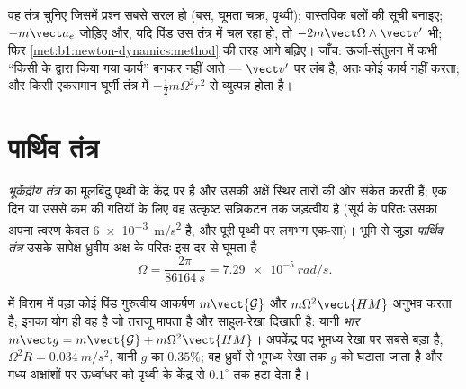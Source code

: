 \begin{method}\label{met:b1:non-inertial-frames:method}
वह तंत्र चुनिए जिसमें प्रश्न सबसे सरल हो (बस, घूमता चक्र, पृथ्वी);
वास्तविक बलों की सूची बनाइए; $-m\vect a_e$ जोड़िए और, यदि पिंड उस तंत्र में
चल रहा हो, तो $-2m\vect\Omega\wedge\vect v'$ भी; फिर
\cref{met:b1:newton-dynamics:method} की तरह आगे बढ़िए। जाँच: 
ऊर्जा-संतुलन में कभी ``किसी के द्वारा किया गया कार्य'' बनकर नहीं आते ---
 $\vect v'$ पर लंब है, अतः कोई कार्य नहीं करता; और 
किसी एकसमान घूर्णी तंत्र में  $-\tfrac12 m\Omega^2r^2$ से
व्युत्पन्न होता है।
\end{method}

\section{पार्थिव तंत्र}

\begin{definition}[भूकेंद्रीय और पार्थिव तंत्र]\label{def:b1:non-inertial-frames:earth}
\emph{भूकेंद्रीय तंत्र} का मूलबिंदु पृथ्वी के केंद्र पर है और उसकी अक्षें
स्थिर तारों की ओर संकेत करती हैं; एक दिन या उससे कम की गतियों के लिए वह
उत्कृष्ट सन्निकटन तक जड़त्वीय है (सूर्य के परितः उसका अपना त्वरण केवल
\qty{6e-3}{m/s^2} है, और पूरी पृथ्वी पर लगभग एक-सा)। भूमि से जुड़ा
\emph{पार्थिव तंत्र} उसके सापेक्ष ध्रुवीय अक्ष के परितः इस दर से घूमता है
\[
\Omega = \frac{2\pi}{\qty{86164}{s}} = \qty{7.29e-5}{rad/s} .
\]
\end{definition}

\begin{proposition}[भार, और $g$ का परिवर्तन]\label{prop:b1:non-inertial-frames:weight}
 में विराम में पड़ा कोई पिंड गुरुत्वीय आकर्षण
$m\vect{\mathcal G}$ और  $m\Omega^2\vect{HM}$ अनुभव करता है; इनका
योग ही वह है जो तराजू मापता है और साहुल-रेखा दिखाती है: यानी \emph{भार}
$m\vect g = m\vect{\mathcal G} + m\Omega^2\vect{HM}$। अपकेंद्र पद भूमध्य
रेखा पर सबसे बड़ा है, $\Omega^2R = \qty{0.034}{m/s^2}$, यानी $g$ का
$0.35\%$; वह ध्रुवों से भूमध्य रेखा तक $g$ को घटाता जाता है
और मध्य अक्षांशों पर ऊर्ध्वाधर को पृथ्वी के केंद्र से $0.1^\circ$ तक हटा
देता है।
\end{proposition}

